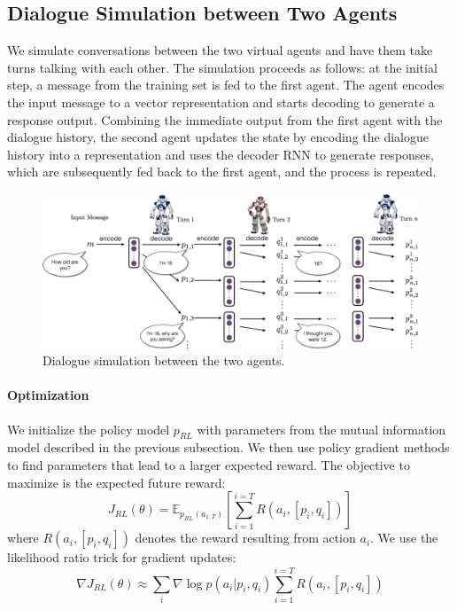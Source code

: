 \subsection{Dialogue Simulation between Two Agents}
\label{sec:learning}
We simulate conversations between the two virtual agents and 
have them take turns talking with each other. The simulation proceeds as follows: at the initial step, a message from the training set is fed to the first agent. The agent encodes the input message to a vector representation and starts decoding to generate  a response output. 
Combining the immediate output from the first agent with the dialogue history, the second agent updates the state by encoding the dialogue history into a representation and uses the decoder RNN to generate responses, which are subsequently fed back to the first agent, and the process is repeated. 

\begin{figure}[!ht]
    \centering
    \includegraphics[width=6in]{img/simulate.png}
\caption{Dialogue simulation between the two agents. }
\end{figure}



\paragraph{Optimization}
We initialize the policy model $p_{RL}$ with parameters from the mutual information model described in the previous subsection. 
We then use policy gradient methods to find parameters that lead to a larger expected reward.
The objective to maximize is the expected future reward:
\begin{equation}
J_{RL}(\theta)=\mathbb{E}_{p_{RL}(a_{1:T})} \left[ \sum_{i=1}^{i=T} R(a_i,[p_i,q_i] ) \right]
\end{equation}
where $R(a_i,[p_i,q_i])$ denotes the reward resulting from action $a_i$. 
We
use the likelihood ratio trick 
\cite{williams1992simple,glynn1990likelihood} for gradient updates:
\begin{equation}
\nabla J_{RL}(\theta) \approx { \sum_{i}\nabla\log p(a_i|p_i,q_i)} \sum_{i=1}^{i=T} R(a_i,[p_i,q_i] )
\end{equation}


